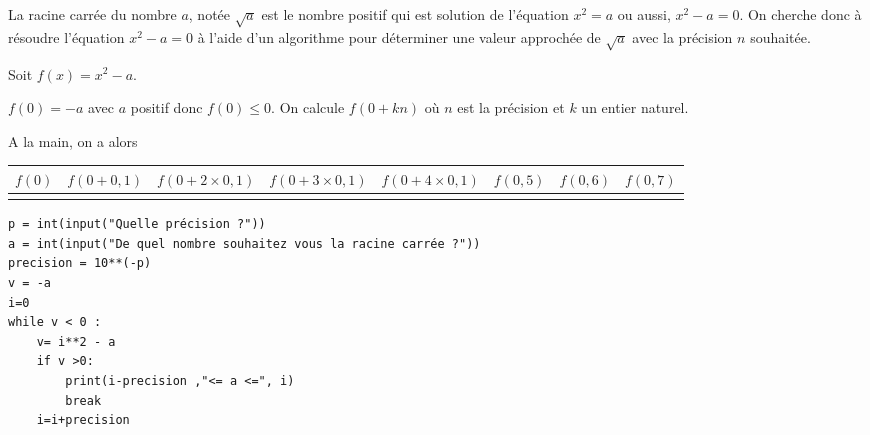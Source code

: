 
La racine carrée du nombre $a$, notée $\sqrt a$ est le nombre positif qui est solution de l'équation $x^2 = a$ ou aussi, $x^2-a=0$. On cherche donc à résoudre l'équation $x^2-a=0$ à l'aide d'un algorithme pour déterminer une valeur approchée de $\sqrt a$ avec la précision $n$ souhaitée.

Soit $f(x)=x^2-a$. 

$f(0)=-a$ avec $a$ positif donc $f(0) \leq 0$. On calcule $f(0+kn)$ où $n$ est la précision et $k$ un entier naturel. 

A la main, on a alors 

\begin{tabular}{|c|c|c|c|c|c|c|c|}
\hline 
$f(0)$ & $f(0+0,1)$ & $f(0+2\times 0,1)$ & $f(0+3\times0,1)$ & $f(0+4\times0,1)$ & $f(0,5)$ & $f(0,6)$ & $f(0,7)$ \\ 
\hline 
 &  &  &  &  &  &  &  \\
\hline 
\end{tabular} 


\begin{verbatim}
p = int(input("Quelle précision ?"))
a = int(input("De quel nombre souhaitez vous la racine carrée ?"))
precision = 10**(-p)
v = -a
i=0
while v < 0 :
    v= i**2 - a
    if v >0:
        print(i-precision ,"<= a <=", i)
        break
    i=i+precision
\end{verbatim}

